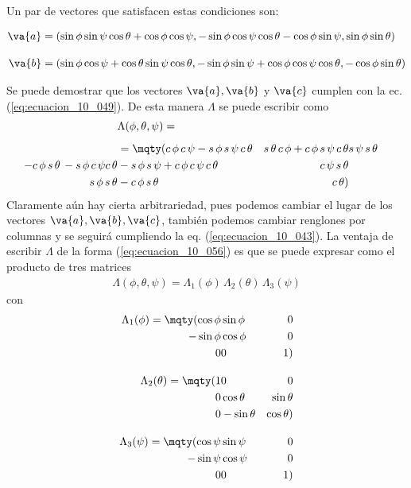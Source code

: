 Un par de vectores que satisfacen estas condiciones son:
\begin{changemargin}{-0.25cm}{-0.25cm} 
\begin{align*}
\va{a} &= (\sin \phi \sin \psi \cos \theta + \cos \phi \cos \psi, - \sin \phi \cos \psi \cos \theta - \cos \phi \sin \psi, \sin \phi \sin \theta) \\[1em]
\va{b} &= (\sin \phi \cos \psi + \cos \theta \sin \psi \cos \theta, -\sin \phi \sin \psi + \cos \phi \cos \psi \cos \theta, - \cos \phi \sin \theta)
\end{align*}
\end{changemargin}
Se puede demostrar que los vectores $\va{a}, \va{b}$ y $\va{c}$ cumplen con la ec. (\ref{eq:ecuacion_10_049}). De esta manera $\Lambda$ se puede escribir como
\begin{align}
\begin{aligned}
&\Lambda (\phi, \theta, \psi) = \\[0.5em]
&= \mqty(
c \, \phi \, c \, \psi - s \, \phi \, s \, \psi \, c \, \theta & s \, \theta \, c \, \phi + c \, \phi \, s \, \psi \, c \, \theta & s \, \psi \, s \, \theta \\
- c \, \phi \, s \, \theta \, - s \, \phi \, c \, \psi c \, \theta & - s \, \phi \, s \, \psi + c \, \phi \, c \, \psi \, c \, \theta & c \, \psi \, s \, \theta \\
s \, \phi \, s \, \theta & - c \, \phi \, s \, \theta & c \, \theta)
\end{aligned}
\label{eq:ecuacion_10_056}
\end{align}
Claramente aún hay cierta arbitrariedad, pues podemos cambiar el lugar de los vectores $\va{a}, \va{b}, \va{c}$, también podemos cambiar renglones por columnas y se seguirá cumpliendo la eq. (\ref{eq:ecuacion_10_043}). La ventaja de escribir $\Lambda$ de la forma (\ref{eq:ecuacion_10_056}) es que se puede expresar como el producto de tres matrices
\begin{align}
\Lambda (\phi, \theta, \psi) = \Lambda_{1} (\phi) \, \Lambda_{2} (\theta) \, \Lambda_{3} (\psi) 
\label{eq:ecuacion_10_057}
\end{align}
con
\begin{align}
\Lambda_{1} (\phi) = \mqty(\cos \phi & \sin \phi & 0 \\ - \sin \phi & \cos \phi & 0 \\ 0 & 0 & 1) \label{eq:ecuacion_10_058} \\[1em]
\Lambda_{2} (\theta) = \mqty(1 & 0 & 0 \\ 0 & \cos \theta & \sin \theta \\ 0 & - \sin \theta & \cos \theta) \label{eq:ecuacion_10_059} \\[1em]
\Lambda_{3} (\psi) = \mqty(\cos \psi & \sin \psi & 0 \\ - \sin \psi & \cos \psi & 0 \\ 0 & 0 & 1) \label{eq:ecuacion_10_060}
\end{align}
